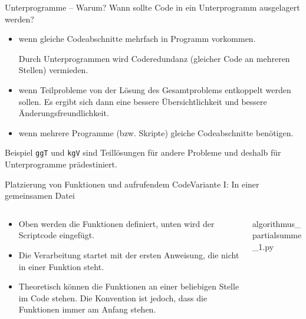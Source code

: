 \documentclass[xelatex,aspectratio=169]{beamer}
\begin{document}
\begin{frame}{Unterprogramme -- Warum?}
  Wann sollte Code in ein Unterprogramm ausgelagert werden?
  \begin{itemize}
    \item wenn gleiche Codeabschnitte mehrfach in Programm vorkommen.

          Durch Unterprogrammen wird Coderedundanz (gleicher Code an mehreren Stellen) vermieden.
    \item wenn Teilprobleme von der Lösung des Gesamtproblems entkoppelt werden sollen. Es ergibt sich dann eine bessere Übersichtlichkeit und bessere Änderungsfreundlichkeit.
    \item wenn mehrere Programme (bzw. Skripte) gleiche Codeabschnitte benötigen.
  \end{itemize}

  \begin{exampleblock}{Beispiel}
    \texttt{ggT} und \texttt{kgV} sind Teillösungen für andere Probleme und deshalb für Unterprogramme prädestiniert.
  \end{exampleblock}

\end{frame}

\begin{frame}{Platzierung von Funktionen und aufrufendem Code}{Variante I: In einer gemeinsamen Datei}
  \vspace{-\baselineskip}
  \begin{columns}
    \begin{column}{.5\linewidth}
      \begin{itemize}
        \item Oben werden die Funktionen definiert, unten wird der Scriptcode eingefügt.

        \item Die Verarbeitung startet mit der ersten Anweisung, die nicht in einer Funktion steht.

        \item Theoretisch können die Funktionen an einer beliebigen Stelle im Code stehen. Die Konvention ist jedoch, dass die Funktionen immer am Anfang stehen.
      \end{itemize}
    \end{column}
    \begin{column}{.5\linewidth}
      \begin{listing}
        \small
        \caption{algorithmus\_partialsumme\_1.py}
        \inputminted{python}{src/algorithmus_partialsumme_1.py}
      \end{listing}
    \end{column}
  \end{columns}
\end{frame}
\end{document}
